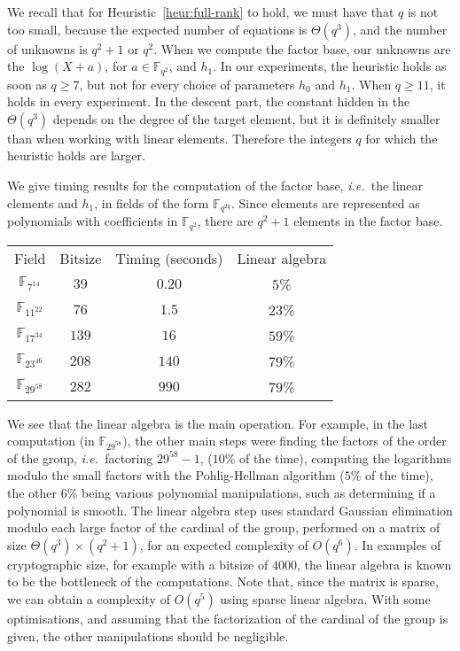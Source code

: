 \documentclass[a4paper,11pt]{article}
\theoremstyle{break}
\theoremstyle{sc}
\theoremstyle{definition}
\theoremstyle{remark}
\newcommand{\ie}{\emph{i.e.\ }}
\begin{document}
We recall that for Heuristic~\ref{heur:full-rank} to hold, we must have that $q$
is not too small, because the expected number of equations is $\Theta(q^3)$,
and the number of unknowns is $q^2+1$ or $q^2$. When we compute the factor
base, our unknowns are the $\log(X + a)$, for
$a\in\mathbb{F}_{q^2}$, and $h_1$. In our experiments, the heuristic holds as
soon as $q\geq 7$, but not for every choice of parameters $h_0$ and $h_1$. When
$q\geq 11$, it holds in every experiment. In the descent part, the constant hidden in the
$\Theta(q^3)$ depends on the degree of the target element, but it is definitely
smaller than when working with linear elements. Therefore the integers $q$
for which the heuristic holds are larger.

We give timing results for the computation of the factor base, \ie the linear
elements and $h_1$, in fields of the form $\mathbb{F}_{q^{2q}}$. Since elements are
represented as polynomials with coefficients in $\mathbb{F}_{q^2}$, there are
$q^2+1$ elements in the factor base.
\begin{center}
\begin{tabular}[here]{cccc}
  Field & Bitsize & Timing (seconds) & Linear algebra \\
  $\mathbb{F}_{7^{14}}$ & $39$ & $0.20$ & $5$\% \\
  $\mathbb{F}_{11^{22}}$ & $76$ & $1.5$ & $23$\% \\
  $\mathbb{F}_{17^{34}}$ & $139$ & $16$ & $59$\% \\
  $\mathbb{F}_{23^{46}}$ & $208$ & $140$ & $79$\% \\
  $\mathbb{F}_{29^{58}}$ & $282$ & $990$ & $79$\% \\
\end{tabular}
\end{center}
We see that the linear algebra is the main operation. For example, in the last
computation (in $\mathbb{F}_{29^{58}})$, the other main steps were finding the
factors of the order of the group, \ie factoring $29^{58}-1$, ($10$\% of the
time), computing the logarithms modulo the small factors with the Pohlig-Hellman
algorithm ($5$\% of the time), the other $6$\% being various polynomial
manipulations, such as determining if a polynomial is smooth. The linear
algebra step uses standard Gaussian elimination modulo each large factor of the
cardinal of the group, performed on a matrix of size
$\Theta(q^3)\times(q^2+1)$, for an expected complexity of $O(q^6)$. In examples
of cryptographic size, for example with a bitsize of $4000$, the linear algebra
is known to be the bottleneck of the computations. Note that, since the matrix
is sparse, we can obtain a complexity of $O(q^5)$ using sparse linear algebra.
With some optimisations, and assuming that the factorization of the cardinal of
the group is given, the other manipulations should be negligible.
\end{document}
